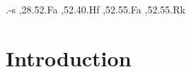\documentclass[final,3p,times,twocolumn]{elsarticle} %
\begin{document}
\begin{frontmatter}
\begin{keyword}


.-s \sep 28.52.Fa \sep 52.40.Hf \sep 52.55.Fa \sep 52.55.Rk
\end{keyword}

\end{frontmatter}

\section{Introduction}



	
	
\end{document}
